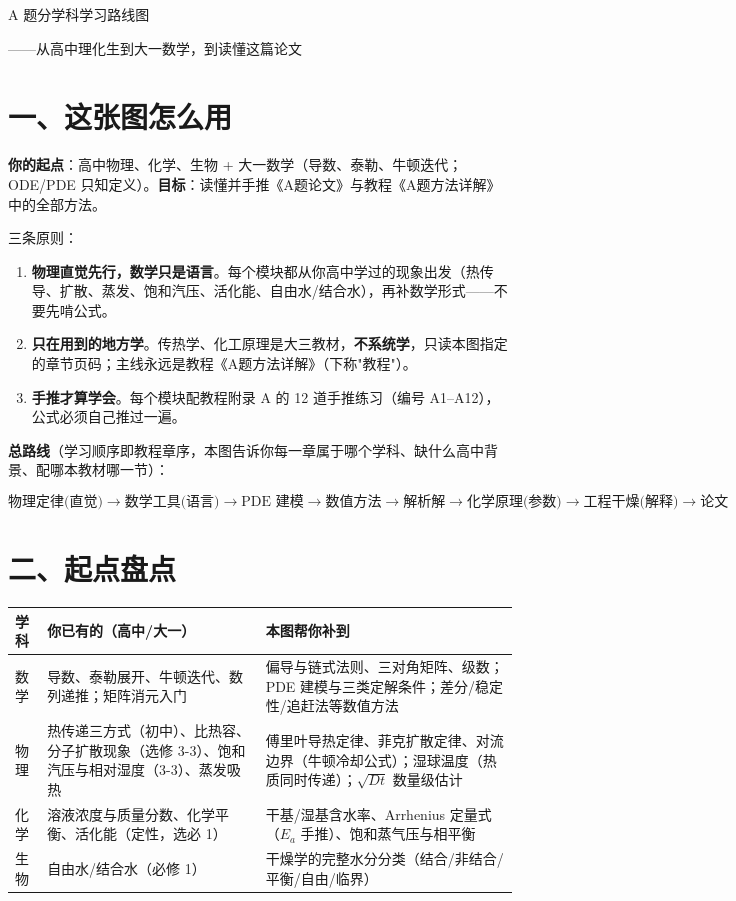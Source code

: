 \documentclass[12pt,a4paper]{ctexart}
\begin{document}
\begin{center}
{\heiti{} A 题分学科学习路线图\par}
\vspace{0.4em}
{\heiti{} ——从高中理化生到大一数学，到读懂这篇论文\par}
\end{center}

\section{一、这张图怎么用}

\textbf{你的起点}：高中物理、化学、生物 + 大一数学（导数、泰勒、牛顿迭代；ODE/PDE 只知定义）。\textbf{目标}：读懂并手推《A题论文》与教程《A题方法详解》中的全部方法。

三条原则：

\begin{enumerate}[leftmargin=2em]
\item \textbf{物理直觉先行，数学只是语言}。每个模块都从你高中学过的现象出发（热传导、扩散、蒸发、饱和汽压、活化能、自由水/结合水），再补数学形式——不要先啃公式。
\item \textbf{只在用到的地方学}。传热学、化工原理是大三教材，\textbf{不系统学}，只读本图指定的章节页码；主线永远是教程《A题方法详解》（下称"教程"）。
\item \textbf{手推才算学会}。每个模块配教程附录 A 的 12 道手推练习（编号 A1--A12），公式必须自己推过一遍。
\end{enumerate}

\textbf{总路线}（学习顺序即教程章序，本图告诉你每一章属于哪个学科、缺什么高中背景、配哪本教材哪一节）：

$$\text{物理定律(直觉)}\to\text{数学工具(语言)}\to\text{PDE 建模}\to\text{数值方法}\to\text{解析解}\to\text{化学原理(参数)}\to\text{工程干燥(解释)}\to\text{论文}$$

\section{二、起点盘点}

\begin{center}
{\begin{tabular}{p{2.6cm}p{5.2cm}p{5.6cm}}
\toprule
学科 & 你已有的（高中/大一） & 本图帮你补到 \\
\midrule
数学 & 导数、泰勒展开、牛顿迭代、数列递推；矩阵消元入门 & 偏导与链式法则、三对角矩阵、级数；PDE 建模与三类定解条件；差分/稳定性/追赶法等数值方法 \\
物理 & 热传递三方式（初中）、比热容、分子扩散现象（选修 3-3）、饱和汽压与相对湿度（3-3）、蒸发吸热 & 傅里叶导热定律、菲克扩散定律、对流边界（牛顿冷却公式）；湿球温度（热质同时传递）；$\sqrt{Dt}$ 数量级估计 \\
化学 & 溶液浓度与质量分数、化学平衡、活化能（定性，选必 1） & 干基/湿基含水率、Arrhenius 定量式（$E_a$ 手推）、饱和蒸气压与相平衡 \\
生物 & 自由水/结合水（必修 1） & 干燥学的完整水分分类（结合/非结合/平衡/自由/临界） \\
\bottomrule
\end{tabular}}
\end{center}
\end{document}
